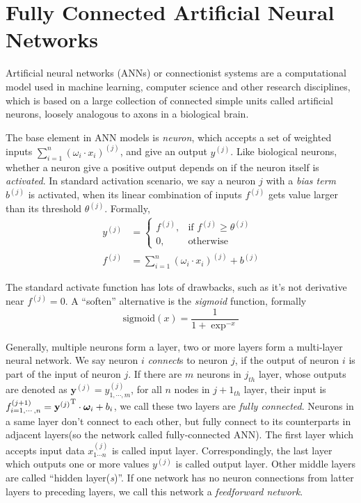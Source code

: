 \section{Fully Connected Artificial Neural Networks}
Artificial neural networks (ANNs) or connectionist systems are a computational model used in machine learning, 
computer science and other research disciplines, which is based on a large collection of connected simple units called artificial neurons, 
loosely analogous to axons in a biological brain\cite{kohonen1988introduction}.

The base element in ANN models is \textit{neuron}, which accepts a set of weighted inputs
$\sum_{i=1}^{n}(\omega_i\cdot x_i)^{(j)}$, and give an output $y^{(j)}$. 
Like biological neurons, whether a neuron give a positive output depends on if the
neuron itself is \textit{activated}. In standard activation scenario, 
we say a neuron $j$ with a \textit{bias term} $b^{(j)}$ is activated,
when its linear combination of inputs $f^{(j)}$ gets value larger than its threshold $\theta^{(j)}$.
Formally,
\begin{equation}
\begin{array}{rl}
y^{(j)}&=\left\{
        \begin{array}{rl}
        f^{(j)} ,& \textrm{if $f^{(j)} \ge \theta^{(j)}$} \\
        0 ,& \textrm{otherwise}
        \end{array}
\right. \\
f^{(j)}&=\sum_{i=1}^{n}(\omega_i\cdot x_i)^{(j)} + b^{(j)}
\end{array}
\end{equation}

The standard activate function has lots of drawbacks, such as it's not derivative
near $f^{(j)} = 0$. A ``soften'' alternative is the \textit{sigmoid} function,
formally
\begin{equation}
\textrm{sigmoid}(x)=\frac{1}{1+\exp^{-x}}
\end{equation} 

Generally, multiple neurons form a layer, two or more layers form a multi-layer
neural network. 
We say neuron $i$ \textit{connect}s to neuron $j$, if the output of neuron $i$ is
part of the input of neuron $j$.
If there are $m$ neurons in $j_{th}$ layer, whose outputs are denoted as $\mathbf{y}^{(j)} = y^{(j)}_{1,\cdots,m}$,
for all $n$ nodes in $j + 1_{th}$ layer, their input is $f^{(j+1)}_{i=1,\cdots,n}={\mathbf{y}^{(j)}}^{\rm T} \cdot \bm{\omega}_i + b_i$,
we call these two layers are \textit{fully connected}.
Neurons in a same layer don't connect to each other, but fully connect to its counterparts
in adjacent layers(so the network called fully-connected ANN). 
The first layer which accepts input data $x_{1\cdots n}^{(j)}$ is called input layer.
Correspondingly, the last layer which outputs one or more values $y^{(j)}$ is called output layer.
Other middle layers are called ``hidden layer(\textit{s})''.
If one network has no neuron connections from latter layers to preceding layers,
we call this network a \textit{feedforward network}.


